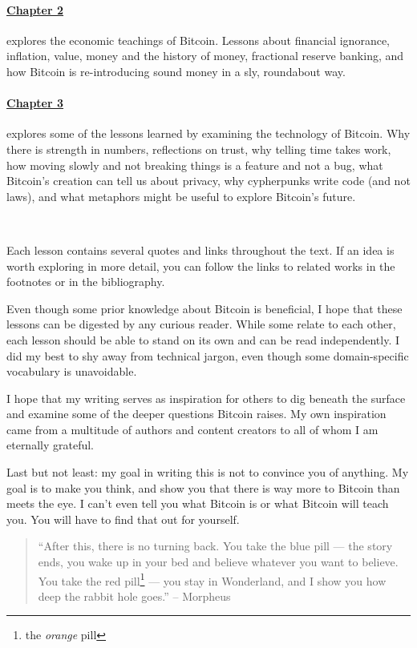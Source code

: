 \paragraph{\hyperref[ch:economics]{Chapter 2}}{explores the economic teachings
of Bitcoin. Lessons about financial ignorance, inflation, value, money and the
history of money, fractional reserve banking, and how Bitcoin is re-introducing
sound money in a sly, roundabout way.}

\paragraph{\hyperref[ch:technology]{Chapter 3}}{explores some of the lessons
learned by examining the technology of Bitcoin.  Why there is strength in
numbers, reflections on trust, why telling time takes work, how moving slowly
and not breaking things is a feature and not a bug, what Bitcoin's creation can
tell us about privacy, why cypherpunks write code (and not laws), and what
metaphors might be useful to explore Bitcoin's future.}

~

Each lesson contains several quotes and links throughout the text. If an idea is
worth exploring in more detail, you can follow the links to related works in the
footnotes or in the bibliography.

Even though some prior knowledge about Bitcoin is beneficial, I hope that these
lessons can be digested by any curious reader. While some relate to each other,
each lesson should be able to stand on its own and can be read independently. I
did my best to shy away from technical jargon, even though some domain-specific
vocabulary is unavoidable.

I hope that my writing serves as inspiration for others to dig beneath the
surface and examine some of the deeper questions Bitcoin raises. My own
inspiration came from a multitude of authors and content creators to all of whom
I am eternally grateful.

Last but not least: my goal in writing this is not to convince you of anything.
My goal is to make you think, and show you that there is way more to Bitcoin
than meets the eye. I can’t even tell you what Bitcoin is or what Bitcoin will
teach you. You will have to find that out for yourself.

\begin{samepage}\begin{quotation}
\enquote{After this, there is no turning back. You take the blue pill --- the
story ends, you wake up in your bed and believe whatever you want to
believe. You take the red pill\footnote{the \textit{orange} pill} --- you stay in Wonderland, and I show
you how deep the rabbit hole goes.}
\flushright -- Morpheus
\end{quotation}\end{samepage}


